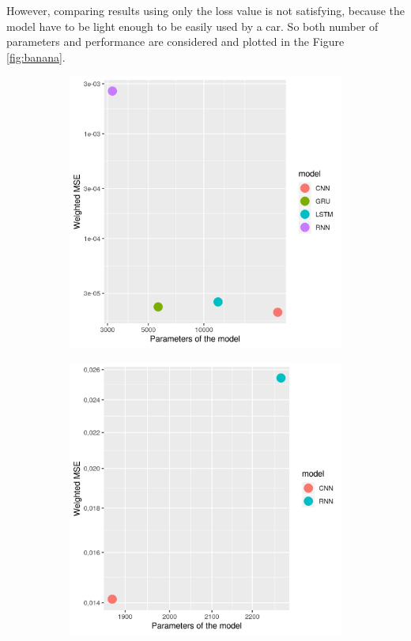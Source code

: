 However, comparing results using only the loss value is not satisfying, because the model have to be light enough to be easily used by a car. So both number of parameters and performance are considered and plotted in the Figure \ref{fig:banana}.
\begin{figure}[!h]
  \centering
  \begin{subfigure}[b]{0.4\linewidth} \includegraphics[width=\linewidth]{imgs/performance_parameters_Weighted_MSE1.png}
  \end{subfigure}
  \begin{subfigure}[b]{0.4\linewidth} \includegraphics[width=\linewidth]{imgs/performance_parameters_Weighted_MSE2.png}

\end{subfigure}
\end{figure}
